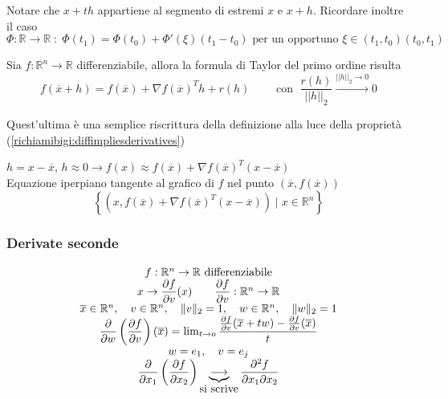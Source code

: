\begin{notes}
Notare che $x + th$ appartiene al segmento di estremi $x$ e $x+h$.
Ricordare inoltre il caso
$$  \Phi : \mathbb{R} \rightarrow \mathbb{R}\; : \;
\Phi(t_1) = \Phi(t_0) +   \Phi'(\xi)(t_1 -t_0)
\text{ per un opportuno } \xi
\in (t_1, t_0)
(t_0,t_1) 
$$
\end{notes}

\begin{defn}
Sia $f:\mathbb{R}^{n} \rightarrow \mathbb{R}$ differenziabile, allora la formula
di Taylor del primo ordine risulta
$$ 
f(\overline{x} + h) =
 f(\overline{x}) + \nabla f (\overline{x})^T h + r(h)
\qquad \text{ con  }\; 
\dfrac{r(h)}{||h||_{2}} \xrightarrow{ || h ||_{2} \to 0} 0$$
\end{defn}
Quest'ultima \`e una semplice riscrittura della definizione
alla luce della propriet\`a (\ref{richiamibigi:diffimpliesderivatives}) 

\begin{defn}
$h = x - \overline{x}$, $h \approx 0  
\rightarrow f(x) \approx f(\overline{x})
 + \nabla f(\overline{x})^{T}(x - \overline{x})$
\\
Equazione iperpiano tangente al grafico di $f$ nel punto
 $(\overline{x}, f(\overline{x}))$
$$ \left\{ (x, f(\overline{x}) + \nabla f(\overline{x})^{T}(x-\overline{x})) 
\; | \; x \in \mathbb{R}^{n} \right\}$$
\end{defn}


\subsubsection{Derivate seconde}
$$
\begin{array}c
f:\mathbb{R}^n \to \mathbb{R} ~ \mbox{differenziabile}\\
x \to \dfrac{\partial f}{\partial v}(x) \qquad \dfrac{\partial f}{\partial v}: \mathbb{R}^n \to \mathbb{R}\\
\overline{x} \in \mathbb{R}^n, \quad v \in \mathbb{R}^n, \quad \Vert v \Vert_2 = 1, \quad w \in \mathbb{R}^n, \quad \Vert w \Vert_2 = 1\\
\dfrac{\partial}{\partial w}\left(\dfrac{\partial f}{\partial v} \right)(\overline{x}) = \lim_{t \to o}\dfrac{\frac{\partial f}{\partial v}(\overline{x} + tw)-\frac{\partial f}{\partial v}(\overline{x})}{t}\\
w = e_1, \quad v = e_j\\
\dfrac{\partial}{\partial x_1}\left(\dfrac{\partial f}{\partial x_2}\right) \underbrace{\longrightarrow}_{\mbox{si scrive}} \dfrac{\partial^2 f}{\partial x_1 \partial x_2}
\end{array}
$$  

